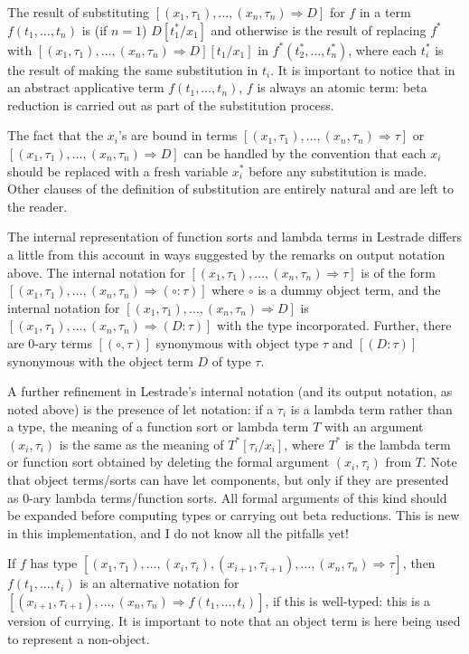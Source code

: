 \documentclass[12pt]{article}
\begin{document}
The result of substituting $[(x_1,\tau_1),\ldots,(x_n,\tau_n) \Rightarrow D]$ for $f$ in a term $f(t_1,\ldots,t_n)$ is (if $n=1$) $D[t_1^*/x_1]$ and otherwise is the result of replacing
$f^*$ with $[(x_1,\tau_1),\ldots,(x_n,\tau_n) \Rightarrow D][t_1/x_1]$ in $f^*(t_2^*,\ldots,t_n^* )$, where each $t_i^*$ is the result of making the same substitution in $t_i$.  It is important to notice that in an abstract applicative term $f(t_1,\ldots,t_n)$, $f$ is always an atomic term:  beta reduction is carried out as part of the substitution process.

The fact that the $x_i$'s are bound in terms $[(x_1,\tau_1),\ldots,(x_n,\tau_n) \Rightarrow \tau]$ or $[(x_1,\tau_1),\ldots,(x_n,\tau_n) \Rightarrow D]$ can be handled by the convention that each $x_i$ should be replaced with a fresh variable $x_i^*$ before any substitution is made.  Other clauses of the definition of substitution are entirely natural and are left to the reader.

The internal representation of function sorts and lambda terms in Lestrade differs a little from this account in ways suggested by the remarks on output notation above.
The internal notation for $[(x_1,\tau_1),\ldots,(x_n,\tau_n) \Rightarrow \tau]$ is of the form $[(x_1,\tau_1),\ldots,(x_n,\tau_n) \Rightarrow (\circ:\tau)]$  where $\circ$ is a dummy object term,  and the internal notation for $[(x_1,\tau_1),\ldots,(x_n,\tau_n) \Rightarrow D]$ is $[(x_1,\tau_1),\ldots,(x_n,\tau_n) \Rightarrow (D:\tau)]$ with the type incorporated.
Further, there are 0-ary terms $[(\circ,\tau)]$ synonymous with object type $\tau$ and $[(D:\tau)]$ synonymous with the object term $D$ of type $\tau$.

A further refinement in Lestrade's internal notation (and its output notation, as noted above) is the presence of let notation:  if a $\tau_i$ is a lambda term rather than a type, the meaning of a function sort or lambda term $T$ with an argument $(x_i,\tau_i)$ is
the same as the meaning of $T^*[\tau_i/x_i]$, where $T^*$ is the lambda term or function sort obtained by deleting the formal argument $(x_i,\tau_i)$ from $T$.  Note that object
terms/sorts  can have let components, but only if they are presented as 0-ary lambda terms/function sorts.  All formal arguments of this kind should be expanded before computing types
or carrying out beta reductions.  This is new in this implementation, and I do not know all the pitfalls yet!

If $f$ has type $[(x_1,\tau_1),\ldots,(x_i,\tau_i),(x_{i+1},\tau_{i+1}),\ldots,(x_n,\tau_n)\Rightarrow \tau]$, then $f(t_1,\ldots,t_i)$ is an alternative notation for $[(x_{i+1},\tau_{i+1}),\ldots,(x_n,\tau_n)\Rightarrow f(t_1,\ldots,t_i)]$, if this is well-typed:  this is a version of currying.  It is important to note that an object term is here being used to represent a non-object.
\end{document}
